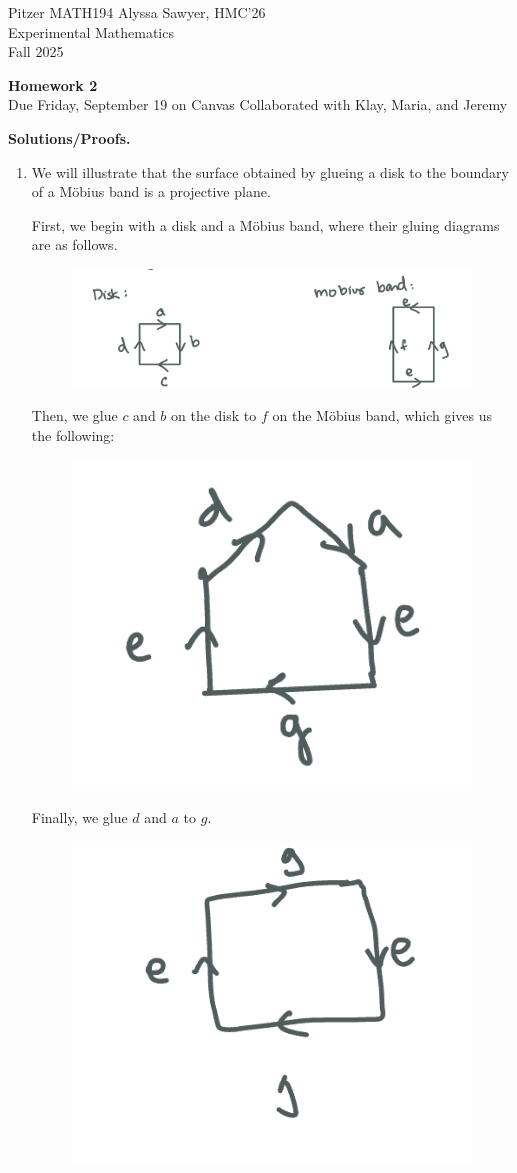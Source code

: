 \documentclass[12pt]{article}
\begin{document}
Pitzer MATH194 \hfill Alyssa Sawyer, HMC'26  
\\
Experimental Mathematics \hfill  \\
Fall 2025
\begin{center}
{\large \bf Homework 2}\\
Due Friday, September 19 on Canvas
Collaborated with Klay, Maria, and Jeremy
\end{center}

{\bf Solutions/Proofs.}
\begin{enumerate}

\item
We will illustrate that the surface obtained by glueing a disk to the boundary of a Möbius band is a projective plane.

First, we begin with a disk and a Möbius band, where their gluing diagrams are as follows.

\begin{figure}[h!] 
    \centering
    \includegraphics[width=0.7\linewidth]{1-1.jpeg} 
\end{figure}

Then, we glue $c$ and $b$ on the disk to $f$ on the Möbius band, which gives us the following:

\begin{figure}[h!] 
    \centering
    \includegraphics[width=0.3\linewidth]{1-2.jpeg} 
\end{figure}

Finally, we glue $d$ and $a$ to $g$.  


\begin{figure}[H] 
    \centering
    \includegraphics[width=0.3\linewidth]{1-3.jpeg} 
\end{figure}


\end{enumerate}
\end{document}
